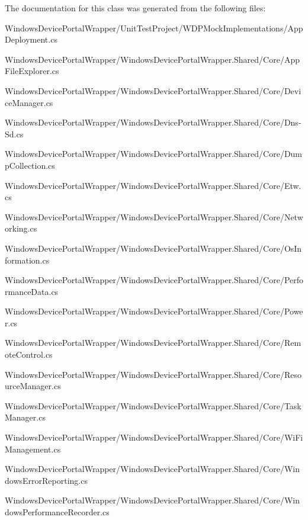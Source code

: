 The documentation for this class was generated from the following files\+:\begin{DoxyCompactItemize}
\item 
Windows\+Device\+Portal\+Wrapper/\+Unit\+Test\+Project/\+W\+D\+P\+Mock\+Implementations/App\+Deployment.\+cs\item 
Windows\+Device\+Portal\+Wrapper/\+Windows\+Device\+Portal\+Wrapper.\+Shared/\+Core/App\+File\+Explorer.\+cs\item 
Windows\+Device\+Portal\+Wrapper/\+Windows\+Device\+Portal\+Wrapper.\+Shared/\+Core/Device\+Manager.\+cs\item 
Windows\+Device\+Portal\+Wrapper/\+Windows\+Device\+Portal\+Wrapper.\+Shared/\+Core/Dns-\/\+Sd.\+cs\item 
Windows\+Device\+Portal\+Wrapper/\+Windows\+Device\+Portal\+Wrapper.\+Shared/\+Core/Dump\+Collection.\+cs\item 
Windows\+Device\+Portal\+Wrapper/\+Windows\+Device\+Portal\+Wrapper.\+Shared/\+Core/Etw.\+cs\item 
Windows\+Device\+Portal\+Wrapper/\+Windows\+Device\+Portal\+Wrapper.\+Shared/\+Core/Networking.\+cs\item 
Windows\+Device\+Portal\+Wrapper/\+Windows\+Device\+Portal\+Wrapper.\+Shared/\+Core/Os\+Information.\+cs\item 
Windows\+Device\+Portal\+Wrapper/\+Windows\+Device\+Portal\+Wrapper.\+Shared/\+Core/Performance\+Data.\+cs\item 
Windows\+Device\+Portal\+Wrapper/\+Windows\+Device\+Portal\+Wrapper.\+Shared/\+Core/Power.\+cs\item 
Windows\+Device\+Portal\+Wrapper/\+Windows\+Device\+Portal\+Wrapper.\+Shared/\+Core/Remote\+Control.\+cs\item 
Windows\+Device\+Portal\+Wrapper/\+Windows\+Device\+Portal\+Wrapper.\+Shared/\+Core/Resource\+Manager.\+cs\item 
Windows\+Device\+Portal\+Wrapper/\+Windows\+Device\+Portal\+Wrapper.\+Shared/\+Core/Task\+Manager.\+cs\item 
Windows\+Device\+Portal\+Wrapper/\+Windows\+Device\+Portal\+Wrapper.\+Shared/\+Core/Wi\+Fi\+Management.\+cs\item 
Windows\+Device\+Portal\+Wrapper/\+Windows\+Device\+Portal\+Wrapper.\+Shared/\+Core/Windows\+Error\+Reporting.\+cs\item 
Windows\+Device\+Portal\+Wrapper/\+Windows\+Device\+Portal\+Wrapper.\+Shared/\+Core/Windows\+Performance\+Recorder.\+cs\item 

\end{DoxyCompactItemize}
